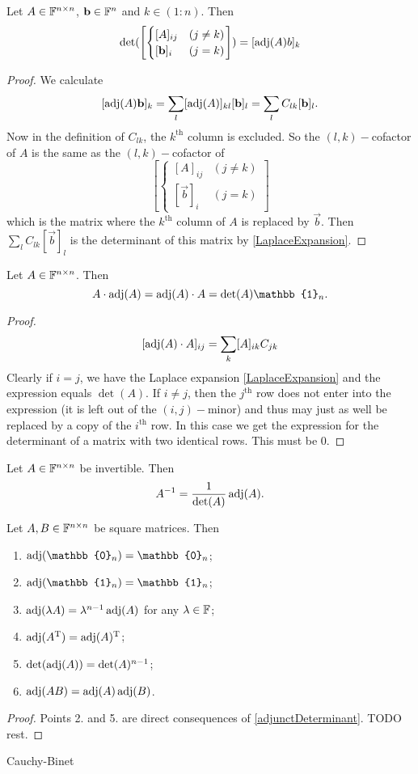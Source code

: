 \begin{lemma}
Let $A\in\mathbb{F}^{n\times n}$, $\boldsymbol{\mathrm{b}}\in \mathbb{F}^n$ and $k\in(1:n)$. Then
\[ \det(\left[\begin{cases}
[A]_{ij} & (j\neq k) \\
[\vec{b}]_i & (j=k)
\end{cases}\right]) = [\adj(A)b]_k \]
\end{lemma}
\begin{proof}
We calculate
\[ [\operatorname{adj}(A)\boldsymbol{\mathrm{b}}]_k = \sum_l [\operatorname{adj}(A)]_{kl}[\boldsymbol{\mathrm{b}}]_l = \sum_l C_{lk}[\boldsymbol{\mathrm{b}}]_l. \]
Now in the definition of $C_{lk}$, the $k^\text{th}$ column is excluded. So the $(l,k)-$cofactor of $A$ is the same as the $(l,k)-$cofactor of 
\[ \left[\begin{cases}
[A]_{ij} & (j\neq k) \\
[\vec{b}]_i & (j=k)
\end{cases}\right] \]
which is the matrix where the $k^\text{th}$ column of $A$ is replaced by $\vec{b}$. Then $\sum_l C_{lk}[\vec{b}]_l$ is the determinant of this matrix by \ref{LaplaceExpansion}.
\end{proof}

\begin{proposition} \label{adjunctDeterminant}
Let $A\in\mathbb{F}^{n\times n}$. Then
\[ A\cdot\adj(A) = \adj(A)\cdot A = \det(A) \mathbb{1}_n. \]
\end{proposition}
\begin{proof}
\[ [\operatorname{adj}(A)\cdot A]_{ij} = \sum_k [A]_{ik}C_{jk} \]
Clearly if $i=j$, we have the Laplace expansion \ref{LaplaceExpansion} and the expression equals $\det(A)$. If $i\neq j$, then the $j^\text{th}$ row does not enter into the expression (it is left out of the $(i,j)-$minor) and thus may just as well be replaced by a copy of the $i^\text{th}$ row. In this case we get the expression for the determinant of a matrix with two identical rows. This must be $0$.
\end{proof}
\begin{corollary} \label{inverseAdjunctDeterminant}
Let $A\in\mathbb{F}^{n\times n}$ be invertible. Then
\[ A^{-1} = \frac{1}{\det(A)}\operatorname{adj}(A). \]
\end{corollary}

\begin{proposition}
Let $A,B\in\mathbb{F}^{n\times n}$ be square matrices. Then
\begin{enumerate}
\item $\adj(\mathbb{0}_n) = \mathbb{0}_n$;
\item $\adj(\mathbb{1}_n) = \mathbb{1}_n$;
\item $\operatorname{adj}(\lambda A) = \lambda^{n-1}\operatorname{adj}(A)$ for any $\lambda\in \mathbb{F}$;
\item $\operatorname{adj}(A^{\mathrm{T}}) = \operatorname{adj}(A)^{\mathrm{T}}$;
\item $\det(\operatorname{adj}(A)) = \det(A)^{n-1}$;
\item $\operatorname{adj}(AB) = \operatorname{adj}(A)\operatorname{adj}(B)$.
\end{enumerate}
\end{proposition}
\begin{proof}
Points 2. and 5. are direct consequences of \ref{adjunctDeterminant}. TODO rest.
\end{proof}
Cauchy-Binet

